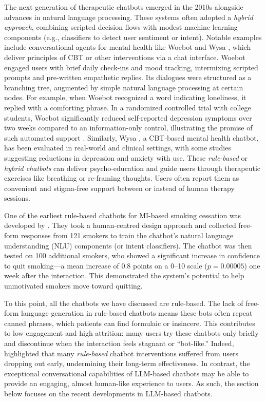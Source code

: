 The next generation of therapeutic chatbots emerged in the 2010s alongside advances in natural language processing. These systems often adopted a \emph{hybrid approach}, combining scripted decision flows with modest machine learning components (e.g., classifiers to detect user sentiment or intent). Notable examples include conversational agents for mental health like Woebot \cite{Fitzpatrick2017} and Wysa \cite{Chang2024}, which deliver principles of CBT or other interventions via a chat interface. Woebot engaged users with brief daily check-ins and mood tracking, intermixing scripted prompts and pre-written empathetic replies. Its dialogues were structured as a branching tree, augmented by simple natural language processing at certain nodes. For example, when Woebot recognized a word indicating loneliness, it replied with a comforting phrase. In a randomized controlled trial with college students, Woebot significantly reduced self-reported depression symptoms over two weeks compared to an information-only control, illustrating the promise of such automated support \cite{Fitzpatrick2017}. Similarly, Wysa \cite{Chang2024}, a CBT-based mental health chatbot, has been evaluated in real-world and clinical settings, with some studies suggesting reductions in depression and anxiety with use. These \emph{rule-based} or \emph{hybrid chatbots} can deliver psycho-education and guide users through therapeutic exercises like breathing or re-framing thoughts. Users often report them as convenient and stigma-free support between or instead of human therapy sessions.

One of the earliest rule-based chatbots for MI-based smoking cessation was developed by \citet{Almusharraf_2019}. They took a human-centred design approach and collected free-form responses from 121 smokers to train the chatbot’s natural language understanding (NLU) components (or intent classifiers). The chatbot was then tested on 100 additional smokers, who showed a significant increase in confidence to quit smoking—a mean increase of 0.8 points on a 0–10 scale ($p=0.00005$) one week after the interaction. This demonstrated the system’s potential to help unmotivated smokers move toward quitting.

To this point, all the chatbots we have discussed are rule-based. The lack of free-form language generation in rule-based chatbots means these bots often repeat canned phrases, which patients can find formulaic or insincere. This contributes to low engagement and high attrition: many users try these chatbots only briefly and discontinue when the interaction feels stagnant or “bot-like.” Indeed, \citet{LIMPANOPPARAT2024100081} highlighted that many \emph{rule-based} chatbot interventions suffered from users dropping out early, undermining their long-term effectiveness. In contrast, the exceptional conversational capabilities of LLM-based chatbots may be able to provide an engaging, almost human-like experience to users. As such, the section below focuses on the recent developments in LLM-based chatbots.


